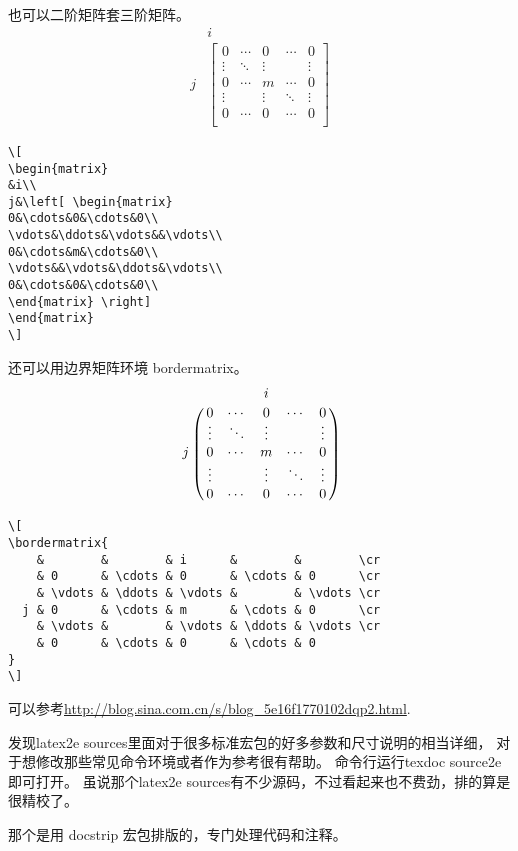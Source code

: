 \documentclass[QAofGroup.tex]{subfiles}
\begin{document}
也可以二阶矩阵套三阶矩阵。
\[
\begin{matrix}
&i\\
j&\left[ \begin{matrix}
0&\cdots&0&\cdots&0\\
\vdots&\ddots&\vdots&&\vdots\\
0&\cdots&m&\cdots&0\\
\vdots&&\vdots&\ddots&\vdots\\
0&\cdots&0&\cdots&0\\
\end{matrix} \right]
\end{matrix}
\]
\begin{verbatim}
\[
\begin{matrix}
&i\\
j&\left[ \begin{matrix}
0&\cdots&0&\cdots&0\\
\vdots&\ddots&\vdots&&\vdots\\
0&\cdots&m&\cdots&0\\
\vdots&&\vdots&\ddots&\vdots\\
0&\cdots&0&\cdots&0\\
\end{matrix} \right]
\end{matrix}
\]
\end{verbatim}

还可以用边界矩阵环境 bordermatrix。
\[
\bordermatrix{
	&	     &        & i      &		&        \cr
	& 0      & \cdots & 0      & \cdots & 0      \cr
	& \vdots & \ddots & \vdots &		& \vdots \cr
  j & 0      & \cdots & m      & \cdots & 0      \cr
	& \vdots &		  & \vdots & \ddots & \vdots \cr
	& 0      & \cdots & 0      & \cdots & 0
}
\]
\begin{verbatim}
\[
\bordermatrix{
	&	     &        & i      &		&        \cr
	& 0      & \cdots & 0      & \cdots & 0      \cr
	& \vdots & \ddots & \vdots &		& \vdots \cr
  j & 0      & \cdots & m      & \cdots & 0      \cr
	& \vdots &		  & \vdots & \ddots & \vdots \cr
	& 0      & \cdots & 0      & \cdots & 0
}
\]
\end{verbatim}

可以参考\url{http://blog.sina.com.cn/s/blog_5e16f1770102dqp2.html}.

\begin{qst}\label{Q2017110203}
发现latex2e sources里面对于很多标准宏包的好多参数和尺寸说明的相当详细，
 对于想修改那些常见命令环境或者作为参考很有帮助。
命令行运行texdoc source2e即可打开。
虽说那个latex2e sources有不少源码，不过看起来也不费劲，排的算是很精校了。

\end{qst}
\ans 那个是用 docstrip 宏包排版的，专门处理代码和注释。
\end{document}
